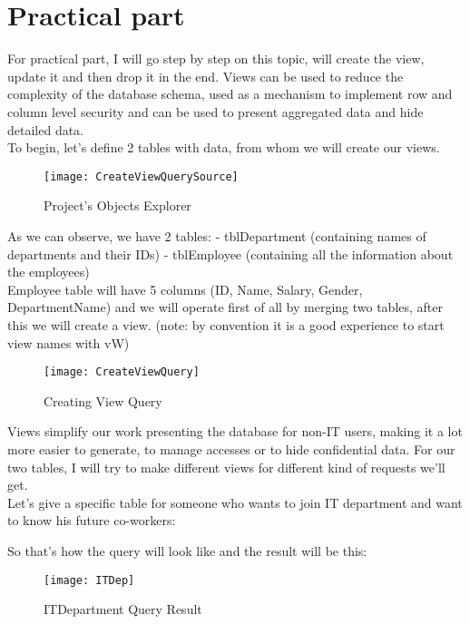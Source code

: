 \section{Practical part}



For practical part, I will go step by step on this topic, will create the view, update it and then drop it in the end. Views can be used to reduce the complexity of the database schema, used as a mechanism to implement row and column level security and can be used to present aggregated data and hide detailed data.\\
 To begin, let's define 2 tables with data, from whom we will create our views. 
\begin{figure}[ht!]
    \centering
    \texttt{[image: CreateViewQuerySource]}
    \caption{Project's Objects Explorer}
    \label{fig_21}
\end{figure}

As we can observe, we have 2 tables:
- tblDepartment (containing names of departments and their IDs)
- tblEmployee (containing all the information about the employees)
\\
Employee table will have 5 columns (ID, Name, Salary, Gender, DepartmentName)
and we will operate first of all by merging two tables, after this we will create a view. (note: by convention it is a good experience to start view names with vW)\\

\begin{figure}[ht!]
    \centering
    \texttt{[image: CreateViewQuery]}
    \caption{Creating View Query}
    \label{fig_21}
\end{figure}

Views simplify our work presenting the database for non-IT users, making it a lot more easier to generate, to manage accesses or to hide confidential data.
For our two tables, I will try to make different views for different kind of requests we'll get. \\
Let's give a specific table for someone who wants to join IT department and want to know his future co-workers:

So that's how the query will look like and the result will be this:
\begin{figure}[ht!]
    \centering
    \texttt{[image: ITDep]}
    \caption{ITDepartment Query Result}
    \label{fig_21}
\end{figure}

